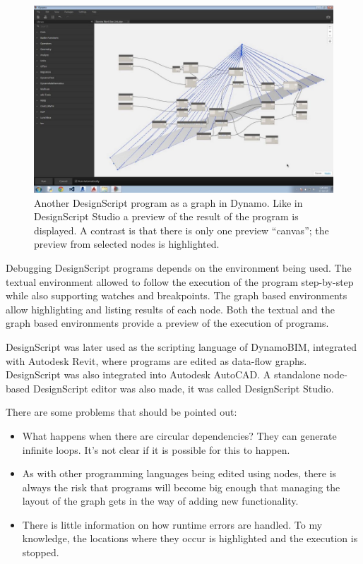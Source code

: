 \documentclass{./llncs2e/llncs}
\begin{document}
	\begin{figure}
	  \centering
	  \includegraphics[width=1.0\textwidth]{img/ds_dynamo}
	    \caption{Another DesignScript program as a graph in Dynamo. Like in DesignScript Studio a preview of the result of the program is displayed. A contrast is that there is only one preview ``canvas''; the preview from selected nodes is highlighted.}
	  \label{fig:ds:dynamo}
	\end{figure} 

	Debugging DesignScript programs depends on the environment being used. 
	The textual environment allowed to follow the execution of the program step-by-step while also supporting watches and breakpoints. 
	The graph based environments allow highlighting and listing results of each node. 
	Both the textual and the graph based environments provide a preview of the execution of programs.

	
	DesignScript was later used as the scripting language of DynamoBIM, integrated with Autodesk Revit, where programs are edited as data-flow graphs. 
	DesignScript was also integrated into Autodesk AutoCAD. 
	A standalone node-based DesignScript editor was also made, it was called DesignScript Studio.

	There are some problems that should be pointed out:
	\begin{itemize}
		\item What happens when there are circular dependencies? They can generate infinite loops. 
		It's not clear if it is possible for this to happen.
		\item As with other programming languages being edited using nodes, there is always the risk that programs will become big enough that managing the layout of the graph gets in the way of adding new functionality. 
		\item There is little information on how runtime errors are handled. 
		To my knowledge, the locations where they occur is highlighted and the execution is stopped.
	\end{itemize}
\end{document}
